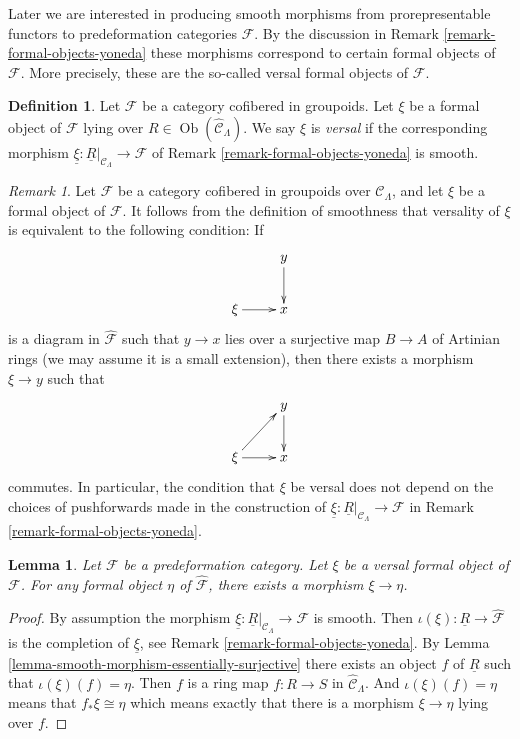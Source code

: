 \documentclass{stacks-project}
\theoremstyle{plain}
\newtheorem{lemma}[subsection]{Lemma}
\theoremstyle{definition}
\newtheorem{definition}[subsection]{Definition}
\theoremstyle{remark}
\newtheorem{remark}[subsection]{Remark}
\numberwithin{equation}{subsection}
\def\Ob{\mathop{\mathrm{Ob}}\nolimits}
\begin{document}
\noindent
Later we are interested in producing smooth morphisms from
prorepresentable functors to predeformation categories $\mathcal{F}$.
By the discussion in
Remark \ref{remark-formal-objects-yoneda}
these morphisms correspond to certain formal objects of $\mathcal{F}$.
More precisely, these are the so-called versal formal objects of $\mathcal{F}$.

\begin{definition}
\label{definition-versal}
Let $\mathcal{F}$ be a category cofibered in groupoids.  Let $\xi$ be a formal
object of $\mathcal{F}$ lying over $R \in \Ob(\widehat{\mathcal{C}}_\Lambda)$.
We say $\xi$ is {\it versal} if the corresponding morphism
$\underline{\xi}: \underline{R}|_{\mathcal{C}_\Lambda} \to \mathcal{F}$
of Remark \ref{remark-formal-objects-yoneda} is smooth.
\end{definition}

\begin{remark}
\label{remark-versal-object}
Let $\mathcal{F}$ be a category cofibered in groupoids over $\mathcal
C_\Lambda$, and let $\xi$ be a formal object of $\mathcal{F}$.  It follows
from the definition of smoothness that versality of $\xi$ is equivalent to the
following condition: If
$$
\xymatrix{
& y \ar[d] \\
\xi \ar[r] & x
}
$$
is a diagram in $\widehat{\mathcal{F}}$ such that $y \to x$ lies over a
surjective map $B \to A$ of Artinian rings (we may assume it is a small
extension),  then there exists a morphism $\xi \to y$ such that
$$
\xymatrix{
& y \ar[d] \\
\xi \ar[r] \ar[ur] & x
}
$$
commutes. In particular, the condition that $\xi$ be versal does not depend on
the choices of pushforwards made in the construction of
$\underline{\xi} : \underline{R}|_{\mathcal{C}_\Lambda} \to \mathcal{F}$ in
Remark \ref{remark-formal-objects-yoneda}.
\end{remark}

\begin{lemma}
\label{lemma-versal-object-quasi-initial}
Let $\mathcal{F}$ be a predeformation category.
Let $\xi$ be a versal formal object of $\mathcal{F}$.
For any formal object $\eta$ of $\widehat{\mathcal{F}}$,
there exists a morphism $\xi \to \eta$.
\end{lemma}

\begin{proof}
By assumption the morphism
$\underline{\xi} : \underline{R}|_{\mathcal{C}_\Lambda} \to \mathcal{F}$
is smooth. Then
$\iota(\xi) : \underline{R} \to \widehat{\mathcal{F}}$
is the completion of $\underline{\xi}$, see
Remark \ref{remark-formal-objects-yoneda}.
By
Lemma \ref{lemma-smooth-morphism-essentially-surjective}
there exists an object $f$ of $\underline{R}$ such that
$\iota(\xi)(f) = \eta$. Then $f$ is
a ring map $f : R \to S$ in $\widehat{\mathcal{C}}_\Lambda$. And
$\iota(\xi)(f) = \eta$ means that
$f_*\xi \cong \eta$ which means exactly that there is a morphism
$\xi \to \eta$ lying over $f$.
\end{proof}
\end{document}

